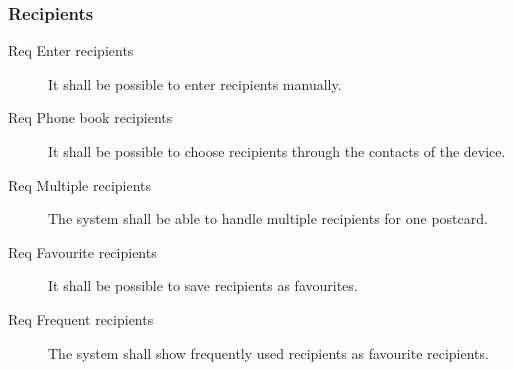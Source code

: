 \documentclass[10pt,a4paper]{article}
\begin{document}
\subsubsection{Recipients}
\begin{description}
	\item [Req  Enter recipients] It shall be possible to enter recipients manually.
	\item [Req  Phone book recipients] It shall be possible to choose recipients through the contacts of the device.
	\item [Req  Multiple recipients] The system shall be able to handle multiple recipients for one postcard.
	\item [Req  Favourite recipients] It shall be possible to save recipients as favourites.
	\item [Req  Frequent recipients] The system shall show frequently used recipients as favourite recipients.
\end{description}
\end{document}
